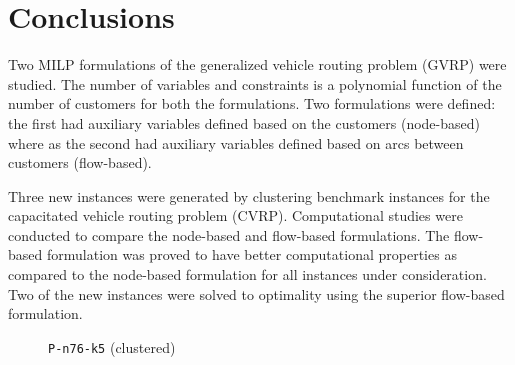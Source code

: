 \documentclass[letterpaper,12pt,onehalfspacing,twoside]{article}
\theoremstyle{msds}
\begin{document}
\section{Conclusions}
Two MILP formulations of the generalized vehicle routing problem (GVRP) were studied. The number of variables and constraints is a polynomial function of the number of customers for both the formulations. 
Two formulations were defined: the first had auxiliary variables defined based on the customers (node-based) where as the second had auxiliary variables defined based on arcs between customers (flow-based). 

Three new instances were generated by clustering benchmark instances for the capacitated vehicle routing problem (CVRP). Computational studies were conducted to compare the node-based and flow-based formulations.
The flow-based formulation was proved to have better computational properties as compared to the node-based formulation for all instances under consideration. Two of the new instances were solved to optimality using the superior flow-based formulation. 

\begin{figure}[htbp]
\centering
{}
\quad
{}
\caption{\texttt{P-n76-k5} (clustered)}
\label{fig:P-n76-k5-c38-sol }
\end{figure}

\newpage



\newpage

%


\end{document}
